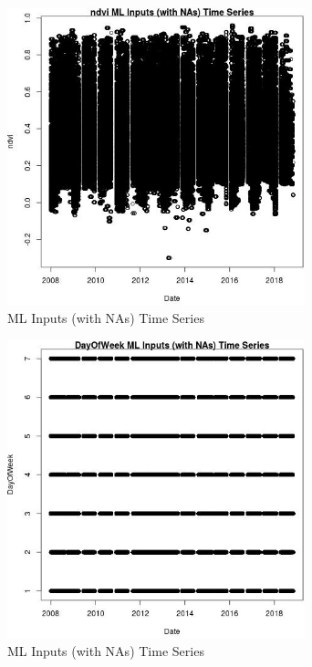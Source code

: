 \begin{figure} 
\centering  
\includegraphics[width=0.77\textwidth]{Code_Outputs/Report_ML_input_PM25_Step4_part_e_de_duplicated_aves_compiled_2019-05-20wNAs_ndvivDate.jpg} 
\caption{\label{fig:Report_ML_input_PM25_Step4_part_e_de_duplicated_aves_compiled_2019-05-20wNAsndvivDate}ML Inputs (with NAs) Time Series} 
\end{figure} 
 

\clearpage 

\begin{figure} 
\centering  
\includegraphics[width=0.77\textwidth]{Code_Outputs/Report_ML_input_PM25_Step4_part_e_de_duplicated_aves_compiled_2019-05-20wNAs_DayOfWeekvDate.jpg} 
\caption{\label{fig:Report_ML_input_PM25_Step4_part_e_de_duplicated_aves_compiled_2019-05-20wNAsDayOfWeekvDate}ML Inputs (with NAs) Time Series} 
\end{figure} 
 

